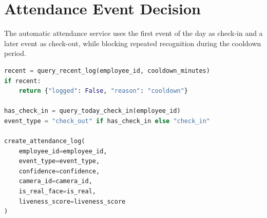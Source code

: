 \section{Attendance Event Decision}

The automatic attendance service uses the first event of the day as check-in and a later event as check-out, while blocking repeated recognition during the cooldown period.

\begin{lstlisting}[style=pythonstyle,language=Python]
recent = query_recent_log(employee_id, cooldown_minutes)
if recent:
    return {"logged": False, "reason": "cooldown"}

has_check_in = query_today_check_in(employee_id)
event_type = "check_out" if has_check_in else "check_in"

create_attendance_log(
    employee_id=employee_id,
    event_type=event_type,
    confidence=confidence,
    camera_id=camera_id,
    is_real_face=is_real,
    liveness_score=liveness_score
)
\end{lstlisting}
